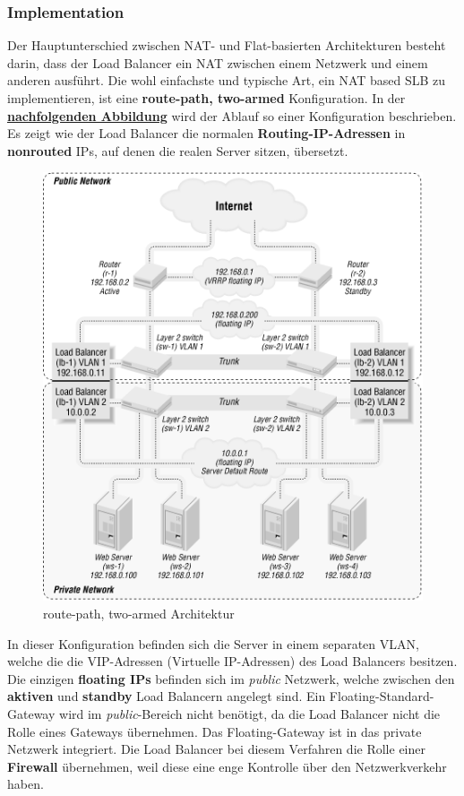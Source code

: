 \subsubsection{Implementation}
Der Hauptunterschied zwischen NAT- und Flat-basierten Architekturen besteht darin, dass der Load Balancer ein NAT zwischen einem Netzwerk und einem anderen ausführt. Die wohl einfachste und typische Art, ein NAT based SLB zu implementieren, ist eine 
\textbf{route-path, two-armed} Konfiguration. In der \textbf{\hyperref[nat_slb_01]{nachfolgenden Abbildung}} wird der Ablauf so einer Konfiguration beschrieben. Es zeigt wie der Load Balancer die normalen \textbf{Routing-IP-Adressen} in \textbf{nonrouted} IPs, auf denen die realen Server sitzen, übersetzt.
\begin{figure}[!h]
	\begin{center}
		\includegraphics[width=0.5\linewidth]{images/slb_0701}
		\caption{route-path, two-armed Architektur}
		\label{nat_slb_01}
	\end{center}
\end{figure}
\newline
In dieser Konfiguration befinden sich die Server in einem separaten VLAN, welche die die VIP-Adressen (Virtuelle IP-Adressen) des Load Balancers besitzen. Die einzigen \textbf{floating IPs} befinden sich im \textit{public} Netzwerk, welche zwischen den \textbf{aktiven} und \textbf{standby} Load Balancern angelegt sind. Ein Floating-Standard-Gateway wird im \textit{public}-Bereich nicht benötigt, da die Load Balancer nicht die Rolle eines Gateways übernehmen. Das Floating-Gateway ist in das private Netzwerk integriert. Die Load Balancer bei diesem Verfahren die Rolle einer \textbf{Firewall} übernehmen, weil diese eine enge Kontrolle über den Netzwerkverkehr haben.

